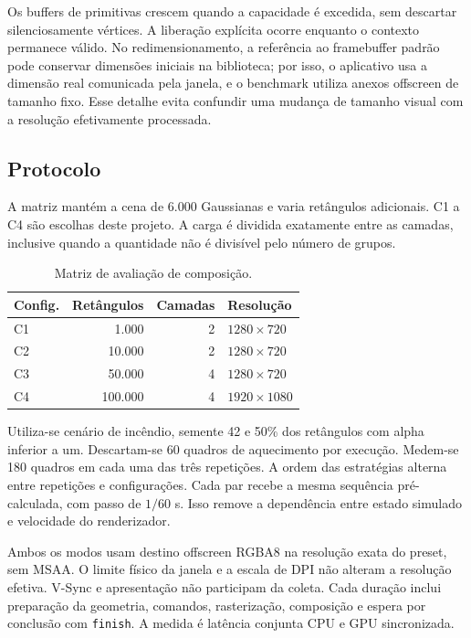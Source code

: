 \documentclass[conference]{IEEEtran}
\begin{document}
Os buffers de primitivas crescem quando a capacidade é excedida, sem descartar silenciosamente vértices. A liberação explícita ocorre enquanto o contexto permanece válido. No redimensionamento, a referência ao framebuffer padrão pode conservar dimensões iniciais na biblioteca; por isso, o aplicativo usa a dimensão real comunicada pela janela, e o benchmark utiliza anexos offscreen de tamanho fixo. Esse detalhe evita confundir uma mudança de tamanho visual com a resolução efetivamente processada.

\subsection{Protocolo}
A matriz mantém a cena de 6.000 Gaussianas e varia retângulos adicionais. C1 a C4 são escolhas deste projeto. A carga é dividida exatamente entre as camadas, inclusive quando a quantidade não é divisível pelo número de grupos.

\begin{table}[t]
\centering
\caption{Matriz de avaliação de composição.}
\begin{tabular}{lrrl}
\toprule
Config. & Retângulos & Camadas & Resolução\\
\midrule
C1 & 1.000 & 2 & $1280\times720$\\
C2 & 10.000 & 2 & $1280\times720$\\
C3 & 50.000 & 4 & $1280\times720$\\
C4 & 100.000 & 4 & $1920\times1080$\\
\bottomrule
\end{tabular}
\end{table}

Utiliza-se cenário de incêndio, semente 42 e 50\% dos retângulos com alpha inferior a um. Descartam-se 60 quadros de aquecimento por execução. Medem-se 180 quadros em cada uma das três repetições. A ordem das estratégias alterna entre repetições e configurações. Cada par recebe a mesma sequência pré-calculada, com passo de $1/60$ s. Isso remove a dependência entre estado simulado e velocidade do renderizador.

Ambos os modos usam destino offscreen RGBA8 na resolução exata do preset, sem MSAA. O limite físico da janela e a escala de DPI não alteram a resolução efetiva. V-Sync e apresentação não participam da coleta. Cada duração inclui preparação da geometria, comandos, rasterização, composição e espera por conclusão com \texttt{finish}. A medida é latência conjunta CPU e GPU sincronizada.
\end{document}
